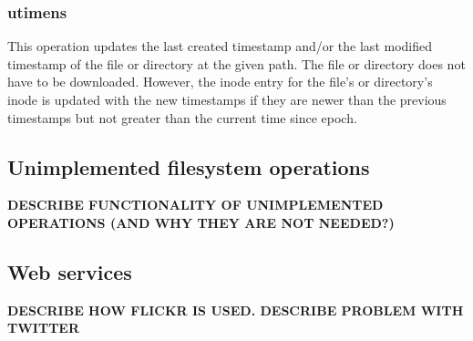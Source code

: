 \subsubsection{utimens}
This operation updates the last created timestamp and/or the last modified timestamp of the file or directory at the given path. The file or directory does not have to be downloaded. However, the inode entry for the file's or directory's inode is updated with the new timestamps if they are newer than the previous timestamps but not greater than the current time since epoch.

\subsection{Unimplemented filesystem operations}
\textbf{DESCRIBE FUNCTIONALITY OF UNIMPLEMENTED OPERATIONS (AND WHY THEY ARE NOT NEEDED?)}

\subsection{Web services}
\textbf{DESCRIBE HOW FLICKR IS USED. DESCRIBE PROBLEM WITH TWITTER}


